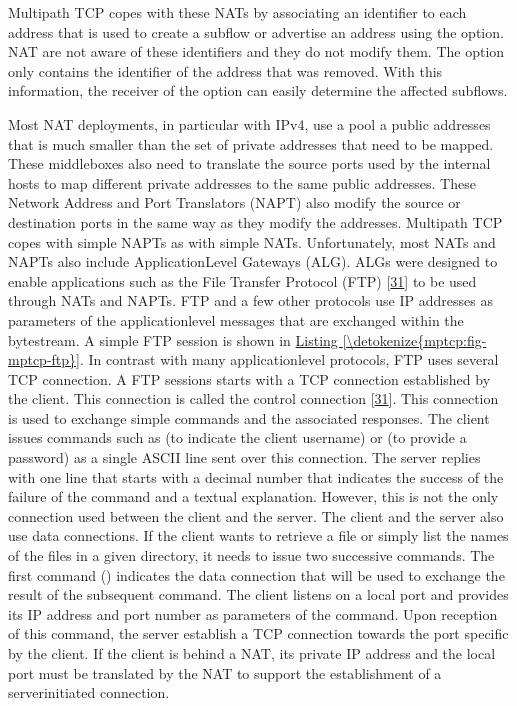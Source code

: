 \documentclass[letterpaper,10pt,english]{sphinxmanual}
\begin{document}
\sphinxAtStartPar
Multipath TCP copes with these NATs by associating an identifier to each address that is used to create a subflow or advertise an address using the  option. NAT are not aware of these identifiers and they do not modify them. The  option only contains the identifier of the address that was removed. With this information, the receiver of the option can easily determine the affected subflows.

\sphinxAtStartPar
Most NAT deployments, in particular with IPv4, use a pool a public addresses that is much smaller than the set of private addresses that need to be mapped. These middleboxes also need to translate the source ports used by the internal hosts to map different private addresses to the same public addresses. These Network Address and Port Translators (NAPT) also modify the source or destination ports in the same way as they modify the addresses. Multipath TCP copes with simple NAPTs as with simple NATs. Unfortunately, most NATs and NAPTs also include Application\sphinxhyphen{}Level Gateways (ALG). ALGs were designed to enable applications such as the File Transfer Protocol (FTP) {[}\hyperlink{cite.biblio:id894}{31}{]} to be used through NATs and NAPTs. FTP and a few other protocols use IP addresses as parameters of the application\sphinxhyphen{}level messages that are exchanged within the bytestream. A simple FTP session is shown in \hyperref[\detokenize{mptcp:fig-mptcp-ftp}]{Listing \ref{\detokenize{mptcp:fig-mptcp-ftp}}}. In contrast with many application\sphinxhyphen{}level protocols, FTP uses several TCP connection. A FTP sessions starts with a TCP connection established by the client. This connection is called the control connection {[}\hyperlink{cite.biblio:id894}{31}{]}. This connection is used to exchange simple commands and the associated responses. The client issues commands such as  (to indicate the client username) or  (to provide a password) as a single ASCII line sent over this connection. The server replies with one line that starts with a decimal number that indicates the success of the failure of the command and a textual explanation. However, this is not the only connection used between the client and the server. The client and the server also use data connections. If the client wants to retrieve a file or simply list the names of the files in a given directory, it needs to issue two successive commands. The first command () indicates the data connection that will be used to exchange the result of the subsequent command. The client listens on a local port and provides its IP address and port number as parameters of the  command. Upon reception of this command, the server establish a TCP connection towards the port specific by the client. If the client is behind a NAT, its private IP address and the local port must be translated by the NAT to support the establishment of a server\sphinxhyphen{}initiated connection.
\end{document}
